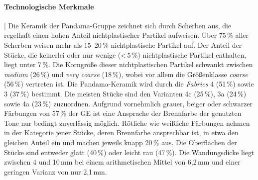 \paragraph{Technologische Merkmale}\hspace{-.5em}|\hspace{.5em}%
Die Keramik der Pandama-Gruppe zeichnet sich durch Scherben aus, die regelhaft einen hohen Anteil nichtplastischer Partikel aufweisen. Über 75\,\% aller Scherben weisen mehr als 15–20\,\% nichtplastische Partikel auf. Der Anteil der Stücke, die keinerlei oder nur wenige (\textless\,5\,\%) nichtplastische Partikel enthalten, liegt unter 7\,\%. Die Korngröße dieser nichtplastischen Partikel schwankt zwischen \textit{medium} (26\,\%) und \textit{very coarse} (18\,\%), wobei vor allem die Größenklasse \textit{coarse} (56\,\%) vertreten ist. Die Pandama-Keramik wird durch die \textit{Fabrics} 4 (51\,\%) sowie 3 (37\,\%) bestimmt. Die meisten Stücke sind den Varianten 4c (25\,\%), 3a (24\,\%) sowie 4a (23\,\%) zuzuordnen. Aufgrund vornehmlich grauer, beiger oder schwarzer Färbungen von 57\,\% der GE ist eine Ansprache der Brennfarbe der genutzten Tone nur bedingt zuverlässig möglich. Rötliche wie weißliche Färbungen nehmen in der Kategorie jener Stücke, deren Brennfarbe ansprechbar ist, in etwa den gleichen Anteil ein und machen jeweils knapp 20\,\% aus. Die Oberflächen der Stücke sind entweder glatt (40\,\%) oder leicht rau (47\,\%). Die Wandungsdicke liegt zwischen 4 und 10\,mm bei einem arithmetischen Mittel von 6,2\,mm und einer geringen Varianz von nur 2,1\,mm. 


